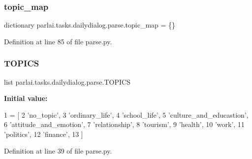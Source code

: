 \subsubsection{\texorpdfstring{topic\+\_\+map}{topic\_map}}
{\footnotesize\ttfamily dictionary parlai.\+tasks.\+dailydialog.\+parse.\+topic\+\_\+map = \{\}}



Definition at line 85 of file parse.\+py.

\mbox{\label{namespaceparlai_1_1tasks_1_1dailydialog_1_1parse_a567cf2e7cf2a587676683cf7a0860ac9}} 
\subsubsection{\texorpdfstring{T\+O\+P\+I\+CS}{TOPICS}}
{\footnotesize\ttfamily list parlai.\+tasks.\+dailydialog.\+parse.\+T\+O\+P\+I\+CS}

{\bfseries Initial value\+:}
\begin{DoxyCode}
1 =  [
2     \textcolor{stringliteral}{'no\_topic'},
3     \textcolor{stringliteral}{'ordinary\_life'},
4     \textcolor{stringliteral}{'school\_life'},
5     \textcolor{stringliteral}{'culture\_and\_educastion'},
6     \textcolor{stringliteral}{'attitude\_and\_emotion'},
7     \textcolor{stringliteral}{'relationship'},
8     \textcolor{stringliteral}{'tourism'},
9     \textcolor{stringliteral}{'health'},
10     \textcolor{stringliteral}{'work'},
11     \textcolor{stringliteral}{'politics'},
12     \textcolor{stringliteral}{'finance'},
13 ]
\end{DoxyCode}


Definition at line 39 of file parse.\+py.

